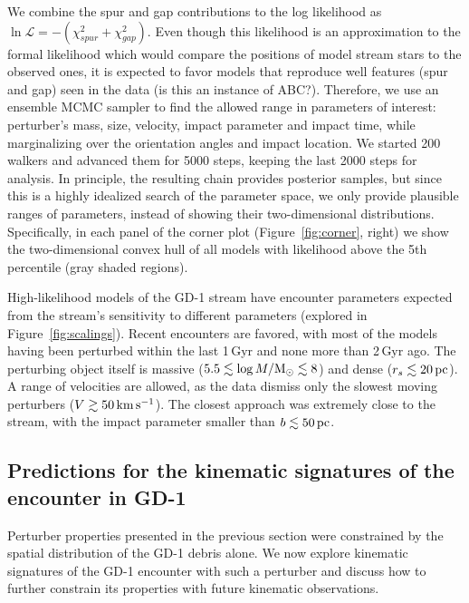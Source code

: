 \documentclass[twocolumn]{aastex62}
\begin{document}
We combine the spur and gap contributions to the log likelihood as $\ln\mathcal{L} = -(\chi^2_{spur} + \chi^2_{gap})$.
Even though this likelihood is an approximation to the formal likelihood which would compare the positions of model stream stars to the observed ones, it is expected to favor models that reproduce well features (spur and gap) seen in the data (is this an instance of ABC?).
Therefore, we use an ensemble MCMC sampler \citep{Foreman-Mackey:2013} to find the allowed range in parameters of interest: perturber's mass, size, velocity, impact parameter and impact time, while marginalizing over the orientation angles and impact location.
We started 200 walkers and advanced them for 5000 steps, keeping the last 2000 steps for analysis.
In principle, the resulting chain provides posterior samples, but since this is a highly idealized search of the parameter space, we only provide plausible ranges of parameters, instead of showing their two-dimensional distributions.
Specifically, in each panel of the corner plot (Figure~\ref{fig:corner}, right) we show the two-dimensional convex hull of all models with likelihood above the 5th percentile (gray shaded regions).

High-likelihood models of the GD-1 stream have encounter parameters expected from the stream's sensitivity to different parameters (explored in Figure~\ref{fig:scalings}).
Recent encounters are favored, with most of the models having been perturbed within the last 1\,Gyr and none more than 2\,Gyr ago.
The perturbing object itself is massive ($5.5\lesssim\log M/\rm M_\odot\lesssim8$) and dense ($r_s\lesssim20\,\rm pc$).
A range of velocities are allowed, as the data dismiss only the slowest moving perturbers ($V\gtrsim50\,\rm km\,s^{-1}$).
The closest approach was extremely close to the stream, with the impact parameter smaller than $b\lesssim50\rm\,pc$.


\subsection{Predictions for the kinematic signatures of the encounter in GD-1}
Perturber properties presented in the previous section were constrained by the spatial distribution of the GD-1 debris alone.
We now explore kinematic signatures of the GD-1 encounter with such a perturber and discuss how to further constrain its properties with future kinematic observations.
\end{document}
